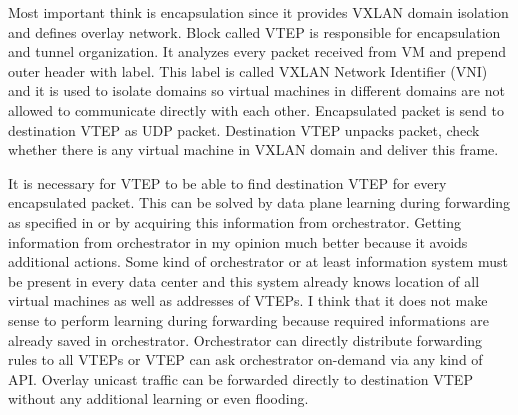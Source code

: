 Most important think is encapsulation since it provides \Ac{VXLAN} domain isolation and defines overlay network. Block called \Ac{VTEP} is responsible for encapsulation and tunnel organization. It analyzes every packet received from \Ac{VM} and prepend outer header with label. This label is called \Ac{VXLAN} Network Identifier (\Ac{VNI}) and it is used to isolate domains so virtual machines in different domains are not allowed to communicate directly with each other. Encapsulated packet is send to destination \Ac{VTEP} as \Ac{UDP} packet. Destination \Ac{VTEP} unpacks packet, check whether there is any virtual machine in \Ac{VXLAN} domain and deliver this frame.

It is necessary for \Ac{VTEP} to be able to find destination \Ac{VTEP} for every encapsulated packet. This can be solved by data plane learning during forwarding as specified in \cite{rfc7348} or by acquiring this information from orchestrator. Getting information from orchestrator in my opinion much better because it avoids additional actions. Some kind of orchestrator or at least information system must be present in every data center and this system already knows location of all virtual machines as well as addresses of \Ac{VTEP}s. I think that it does not make sense to perform learning during forwarding because required informations are already saved in orchestrator. Orchestrator can directly distribute forwarding rules to all \Ac{VTEP}s or \Ac{VTEP} can ask orchestrator on-demand via any kind of \Ac{API}. Overlay unicast traffic can be forwarded directly to destination \Ac{VTEP} without any additional learning or even flooding.

